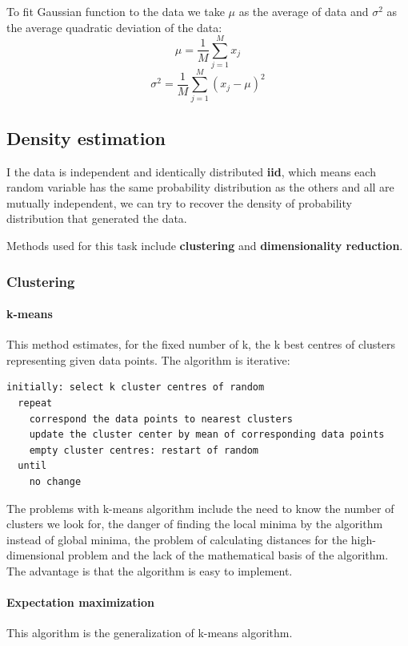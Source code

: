 \documentclass[a4paper,10pt]{article}
\begin{document}
To fit Gaussian function to the data we take $\mu$ as the average of data and $\sigma^2$ as the average quadratic deviation of the data:
\[ \mu = \frac{1}{M} \sum_{j=1}^M x_j \]
\[ \sigma^2 = \frac{1}{M} \sum_{j=1}^M (x_j - \mu)^2 \]

\subsection{Density estimation}

I the data is independent and identically distributed \textbf{iid}, which means each random variable has the same probability distribution as the others and all are mutually independent, we can try to recover the density of probability distribution that generated the data.

Methods used for this task include \textbf{clustering} and \textbf{dimensionality reduction}.

\subsubsection{Clustering}

\paragraph{k-means}

This method estimates, for the fixed number of k, the k best centres of clusters representing given data points. The algorithm is iterative:

\begin{verbatim}
initially: select k cluster centres of random
  repeat
    correspond the data points to nearest clusters
    update the cluster center by mean of corresponding data points
    empty cluster centres: restart of random
  until
    no change
\end{verbatim}

The problems with k-means algorithm include the need to know the number of clusters we look for, the danger of finding the local minima by the algorithm instead of global minima, the problem of calculating distances for the high-dimensional problem and the lack of the mathematical basis of the algorithm. The advantage is that the algorithm is easy to implement.

\paragraph{Expectation maximization}

This algorithm is the generalization of k-means algorithm.
\end{document}
